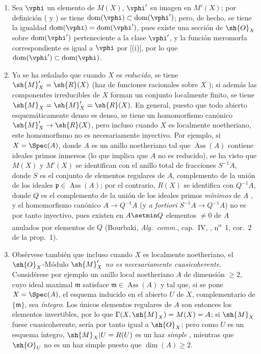\begin{remarks}[20.2.13]
\label{IV.20.2.13}
\begin{enumerate}[label=(\roman*)]
  \item Sea $\vphi$ un elemento de $M(X)$, $\vphi'$ su imagen en $M'(X)$; por definición ( y ) se tiene $\operatorname{dom}(\vphi)\subset\operatorname{dom}(\vphi')$; pero, de hecho, se tiene la igualdad $\operatorname{dom}(\vphi)=\operatorname{dom}(\vphi')$, pues existe una sección de $\sh{O}_X$ sobre $\operatorname{dom}(\vphi')$ perteneciente a la clase $\vphi'$, y la función meromorfa correspondiente es igual a $\vphi$ por [(i)], por lo que $\operatorname{dom}(\vphi')\subset\operatorname{dom}(\vphi)$.

  \item Ya se ha señalado que cuando $X$ es \emph{reducido}, se tiene $\sh{M}'_X=\sh{R}(X)$ (haz de funciones racionales sobre $X$ ); si además las componentes irreducibles de $X$ forman un conjunto localmente finito, se tiene $\sh{M}_X=\sh{M}'_X=\sh{R}(X)$.
  En general, puesto que todo abierto esquemáticamente denso es denso, se tiene un homomorfismo canónico $\sh{M}'_X\to\sh{R}(X)$, pero incluso cuando $X$ es localmente noetheriano, este homomorfismo no es necesariamente inyectivo.
  Por ejemplo, si $X=\Spec(A)$, donde $A$ es un anillo noetheriano tal que $\operatorname{Ass}(A)$ contiene ideales primos inmersos (lo que implica que $A$ no es reducido), se ha visto que $M(X)$ y $M'(X)$ se identifican con el anillo total de fracciones $S^{-1}A$,
  donde $S$ es el conjunto de elementos regulares de $A$, complemento de la unión de los ideales $\mathfrak{p}\in\operatorname{Ass}(A)$; por el contrario, $R(X)$ se identifica con $Q^{-1}A$, donde $Q$ es el complemento de la unión de los ideales primos \emph{mínimos} de $A$ , y el homomorfismo canónico $A\to Q^{-1}A$ (y \emph{a fortiori} $S^{-1}A\to Q^{-1}A$) no es por tanto inyectivo, pues existen en $A\setmin Q$ elementos $\neq0$ de $A$ anulados por elementos de $Q$ (Bourbaki, \emph{Alg.~comm.}, cap.~IV, , n\textsuperscript{o}~1, cor.~2 de la prop.~1).

  \item Obsérvese también que incluso cuando $X$ es localmente noetheriano, el $\sh{O}_X$-Módulo $\sh{M}'_X$ \emph{no es necesariamente cuasicoherente}.
  Considérese por ejemplo un anillo local noetheriano $A$ de dimensión $\geq2$, cuyo ideal maximal $\mathfrak{m}$ satisface $\mathfrak{m}\in\operatorname{Ass}(A)$ y tal que, si se pone $X=\Spec(A)$, el esquema inducido en el abierto $U$ de $X$, complementario de $\{\mathfrak{m}\}$, sea \emph{íntegro}.
  Los únicos elementos regulares de $A$ son entonces los elementos invertibles, por lo que $\Gamma(X,\sh{M}_X)=M(X)=A$; si $\sh{M}_X$ fuese cuasicoherente, sería por tanto igual a $\sh{O}_X$; pero como $U$ es un esquema íntegro, $\sh{M}_X|U=R(U)$ es un haz \emph{simple} , mientras que $\sh{O}_U$ no es un haz simple puesto que $\dim(A)\geq2$.


\end{enumerate}
\end{remarks}
